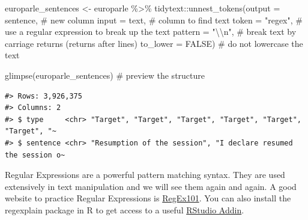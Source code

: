 \documentclass[
  letterpaper,
]{latex/krantz}
\newenvironment{Shaded}{\begin{snugshade}}{\end{snugshade}}
\newcommand{\AttributeTok}[1]{\textcolor[rgb]{0.40,0.45,0.13}{#1}}
\newcommand{\CommentTok}[1]{\textcolor[rgb]{0.37,0.37,0.37}{#1}}
\newcommand{\ConstantTok}[1]{\textcolor[rgb]{0.56,0.35,0.01}{#1}}
\newcommand{\FunctionTok}[1]{\textcolor[rgb]{0.28,0.35,0.67}{#1}}
\newcommand{\NormalTok}[1]{\textcolor[rgb]{0.00,0.23,0.31}{#1}}
\newcommand{\OtherTok}[1]{\textcolor[rgb]{0.00,0.23,0.31}{#1}}
\newcommand{\SpecialCharTok}[1]{\textcolor[rgb]{0.37,0.37,0.37}{#1}}
\newcommand{\StringTok}[1]{\textcolor[rgb]{0.13,0.47,0.30}{#1}}
\begin{document}
\begin{Shaded}
\begin{Highlighting}[]
\NormalTok{europarle\_sentences }\OtherTok{\textless{}{-}} 
\NormalTok{  europarle }\SpecialCharTok{\%\textgreater{}\%} 
\NormalTok{  tidytext}\SpecialCharTok{::}\FunctionTok{unnest\_tokens}\NormalTok{(}\AttributeTok{output =}\NormalTok{ sentence, }\CommentTok{\# new column}
                          \AttributeTok{input =}\NormalTok{ text, }\CommentTok{\# column to find text}
                          \AttributeTok{token =} \StringTok{"regex"}\NormalTok{, }\CommentTok{\# use a regular expression to break up the text}
                          \AttributeTok{pattern =} \StringTok{"}\SpecialCharTok{\textbackslash{}\textbackslash{}}\StringTok{n"}\NormalTok{, }\CommentTok{\# break text by carriage returns (returns after lines)}
                          \AttributeTok{to\_lower =} \ConstantTok{FALSE}\NormalTok{) }\CommentTok{\# do not lowercase the text}

\FunctionTok{glimpse}\NormalTok{(europarle\_sentences) }\CommentTok{\# preview the structure}
\end{Highlighting}
\end{Shaded}

\begin{verbatim}
#> Rows: 3,926,375
#> Columns: 2
#> $ type     <chr> "Target", "Target", "Target", "Target", "Target", "Target", "~
#> $ sentence <chr> "Resumption of the session", "I declare resumed the session o~
\end{verbatim}

\begin{tcolorbox}[enhanced jigsaw, opacitybacktitle=0.6, breakable, colframe=quarto-callout-warning-color-frame, arc=.35mm, left=2mm, leftrule=.75mm, title=\textcolor{quarto-callout-warning-color}{\faExclamationTriangle}\hspace{0.5em}{Tip}, opacityback=0, colback=white, toptitle=1mm, rightrule=.15mm, titlerule=0mm, bottomtitle=1mm, bottomrule=.15mm, coltitle=black, colbacktitle=quarto-callout-warning-color!10!white, toprule=.15mm]
Regular Expressions are a powerful pattern matching syntax. They are
used extensively in text manipulation and we will see them again and
again. A good website to practice Regular Expressions is
\href{https://regex101.com/}{RegEx101}. You can also install the
regexplain package in R to get access to a useful
\href{https://rstudio.github.io/rstudioaddins/}{RStudio Addin}.
\end{tcolorbox}
\end{document}
